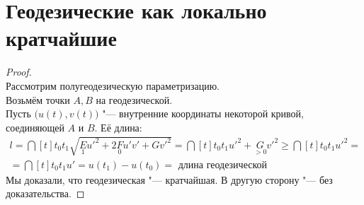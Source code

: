 \section{Геодезические как локально кратчайшие}

\begin{proof}
	\hfill \\
	Рассмотрим полугеодезическую параметризацию. \\
	Возьмём точки $ A, B $ на геодезической. \\
	Пусть $ \big( u(t), v(t) \big) $ "--- внутренние координаты некоторой кривой, соединяющей $ A $ и $ B $. Её длина:
	\begin{multline*}
		l = \dint[t]{t_0}{t_1}{\sqrt{\underset1Eu'^2 + 2\underset0Fu'v' + Gv'^2}} = \dint[t]{t_0}{t_1}{u'^2 + \underset{> 0}Gv'^2} \ge \dint[t]{t_0}{t_1}{u'^2} = \\
		= \dint[t]{t_0}{t_1}{u'} = u(t_1) - u(t_0) = \text{ длина геодезической}
	\end{multline*}
	Мы доказали, что геодезическая "--- кратчайшая. В другую сторону "--- без доказательства.
\end{proof}
